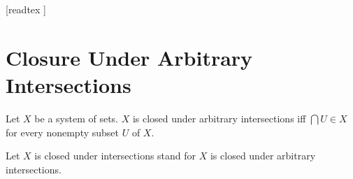 \documentclass[10pt]{article}
\begin{document}
  \begin{imports}
    \begin{forthel}
      [readtex ]
    \end{forthel}
  \end{imports}


  \section*{Closure Under Arbitrary Intersections}

  \begin{forthel}
    \begin{definition}
      Let $X$ be a system of sets.
      $X$ is closed under arbitrary intersections iff $\bigcap U \in X$ for every nonempty subset $U$ of $X$.
    \end{definition}

    Let $X$ is closed under intersections stand for $X$ is closed under arbitrary intersections.
  \end{forthel}
\end{document}
